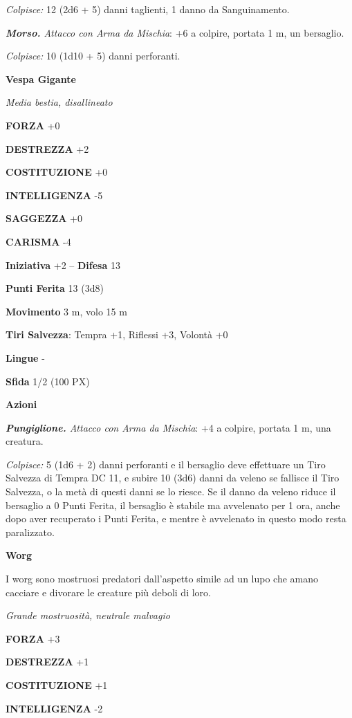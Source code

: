\begin{multicols}{2}
	\textit{Colpisce:} 12 (2d6 + 5) danni taglienti, 1 danno da Sanguinamento.

	\textit{\textbf{Morso.} Attacco con Arma da Mischia}: +6 a colpire, portata 1 m, un bersaglio.

	\textit{Colpisce:} 10 (1d10 + 5) danni perforanti.

	\medskip\textbf{Vespa Gigante}

	\textit{Media bestia, disallineato}

	\textbf{FORZA} +0

	\textbf{DESTREZZA} +2

	\textbf{COSTITUZIONE} +0

	\textbf{INTELLIGENZA} -5

	\textbf{SAGGEZZA} +0

	\textbf{CARISMA} -4

	\textbf{Iniziativa} +2 -- \textbf{Difesa} 13

	\textbf{Punti Ferita} 13 (3d8)

	\textbf{Movimento} 3 m, volo 15 m

	\textbf{Tiri Salvezza}: Tempra +1, Riflessi +3, Volontà +0

	\textbf{Lingue} -

	\textbf{Sfida} 1/2 (100 PX)

	\textbf{Azioni}

	\textit{\textbf{Pungiglione.} Attacco con Arma da Mischia}: +4 a colpire, portata 1 m, una creatura.

	\textit{Colpisce:} 5 (1d6 + 2) danni perforanti e il bersaglio deve effettuare un Tiro Salvezza di Tempra DC 11, e subire 10 (3d6) danni da veleno se fallisce il Tiro Salvezza, o la metà di questi danni se lo riesce. Se il danno da veleno riduce il bersaglio a 0 Punti Ferita, il bersaglio è stabile ma avvelenato per 1 ora, anche dopo aver recuperato i Punti Ferita, e mentre è avvelenato in questo modo resta paralizzato.

	\medskip\textbf{Worg}

	I worg sono mostruosi predatori dall'aspetto simile ad un lupo che amano cacciare e divorare le creature più deboli di loro.

	\textit{Grande mostruosità, neutrale malvagio}

	\textbf{FORZA} +3

	\textbf{DESTREZZA} +1

	\textbf{COSTITUZIONE} +1

	\textbf{INTELLIGENZA} -2


\end{multicols}
